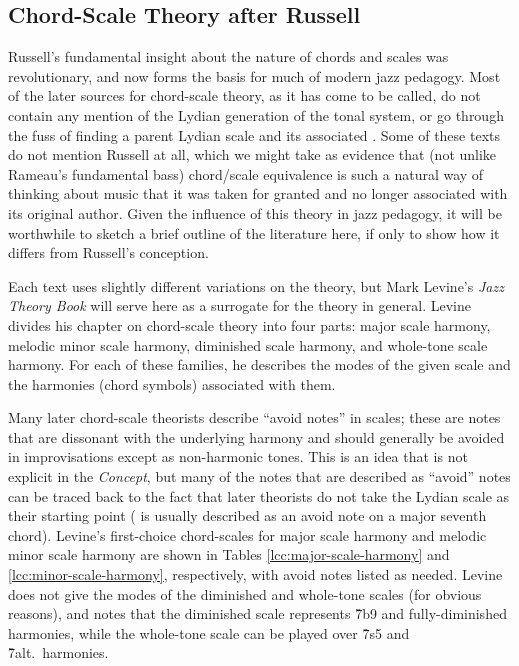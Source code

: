 \subsection{Chord-Scale Theory after Russell}
\label{subsec:chord-scale-reception}

Russell's fundamental insight about the nature of chords and scales was
revolutionary, and now forms the basis for much of modern jazz
pedagogy. Most of the later sources for chord-scale theory, as it has come to
be called, do not contain any mention of the Lydian generation of the tonal
system, or go through the fuss of finding a parent Lydian scale and its
associated . Some of these texts do not mention Russell at all,
which we might take as evidence that (not unlike Rameau's fundamental bass)
chord/scale equivalence is such a natural way of thinking about music that it
was taken for granted and no longer associated with its original author. Given
the influence of this theory in jazz pedagogy, it will be worthwhile to sketch
a brief outline of the literature here, if only to show how it differs from
Russell's conception.

Each text uses slightly different variations on the theory, but Mark
Levine's \emph{Jazz Theory Book} will serve here as a surrogate for the theory
in general. Levine divides his chapter on chord-scale theory into
four parts: major scale harmony, melodic minor scale harmony, diminished scale
harmony, and whole-tone scale harmony. For each of these families, he
describes the modes of the given scale and the harmonies (chord symbols)
associated with them.

Many later chord-scale theorists describe ``avoid notes'' in scales; these
are notes that are dissonant with the underlying harmony and should generally
be avoided in improvisations except as non-harmonic tones. This is an idea
that is not explicit in the \emph{Concept}, but many of the notes that are
described as ``avoid'' notes can be traced back to the fact that later
theorists do not take the Lydian scale as their starting point ( is
usually described as an avoid note on a major seventh chord). Levine's
first-choice chord-scales for major scale harmony and melodic minor scale
harmony are shown in Tables \ref{lcc:major-scale-harmony} and
\ref{lcc:minor-scale-harmony}, respectively, with avoid notes listed as
needed. Levine does not give the modes of the diminished and
whole-tone scales (for obvious reasons), and notes that the diminished scale
represents \h{7b9} and fully-diminished harmonies, while the whole-tone scale
can be played over \h{7s5} and \h{7alt.}\ harmonies.


